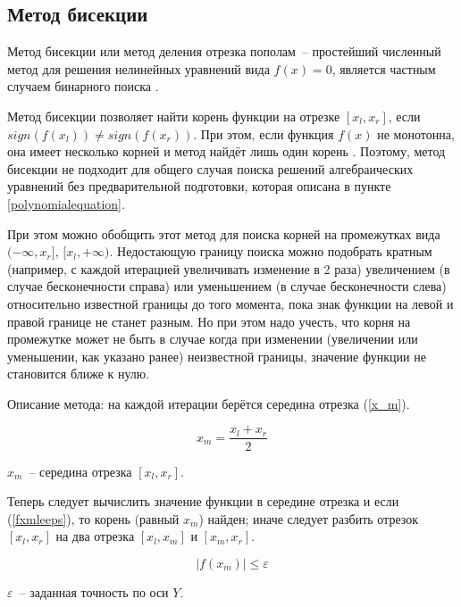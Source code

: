 \subsection{Метод бисекции}\label{bisection}
Метод бисекции или метод деления отрезка пополам~-- простейший численный метод для решения нелинейных уравнений вида \(f(x)=0\),
является частным случаем бинарного поиска \cite{bisectionkaw}.

Метод бисекции позволяет найти корень функции на отрезке \([x_l, x_r]\), если \(sign(f(x_l))\neq sign(f(x_r))\).
При этом, если функция \(f(x)\) не монотонна,
она имеет несколько корней и метод найдёт лишь один корень \cite{bisectionkaw}.
Поэтому, метод бисекции не подходит для общего случая поиска решений алгебраических уравнений
без предварительной подготовки, которая описана в пункте \ref{polynomialequation}.

При этом можно обобщить этот метод для поиска корней на промежутках вида \((-\infty, x_r]\), \([x_l, +\infty)\).
Недостающую границу поиска можно подобрать кратным (например, с каждой итерацией увеличивать изменение в 2 раза) увеличением (в случае бесконечности справа)
или уменьшением (в случае бесконечности слева) относительно известной границы до того момента, пока
знак функции на левой и правой границе не станет разным. Но при этом надо учесть, что корня на промежутке
может не быть в случае когда при изменении (увеличении или уменьшении, как указано ранее) неизвестной границы, значение функции не становится
ближе к нулю.

Описание метода: на каждой итерации берётся середина отрезка (\ref{x_m}).

\begin{equation}\label{x_m}
  x_m = \frac{x_l + x_r}{2}
\end{equation}

\begin{Underequation}
  \(x_m\)~-- середина отрезка \([x_l, x_r]\).
\end{Underequation}

Теперь следует вычислить значение функции в середине отрезка и если (\ref{fxmleeps}), то корень (равный \(x_m\)) найден;
иначе следует разбить отрезок \([x_l, x_r]\) на два отрезка \([x_l, x_m]\) и \([x_m, x_r]\).

\begin{equation}\label{fxmleeps}
  \left|f(x_m)\right| \leqslant \varepsilon
\end{equation}

\begin{Underequation}
  \(\varepsilon\)~-- заданная точность по оси \(Y\).
\end{Underequation}

